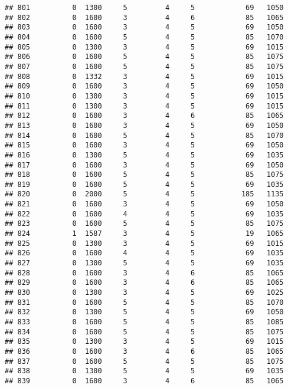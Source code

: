 \documentclass[]{article}
\begin{document}
\begin{verbatim}
## 801          0  1300     5         4     5            69   1050
## 802          0  1600     3         4     6            85   1065
## 803          0  1600     3         4     5            69   1050
## 804          0  1600     5         4     5            85   1070
## 805          0  1300     3         4     5            69   1015
## 806          0  1600     5         4     5            85   1075
## 807          0  1600     5         4     5            85   1075
## 808          0  1332     3         4     5            69   1015
## 809          0  1600     3         4     5            69   1050
## 810          0  1300     3         4     5            69   1015
## 811          0  1300     3         4     5            69   1015
## 812          0  1600     3         4     6            85   1065
## 813          0  1600     3         4     5            69   1050
## 814          0  1600     5         4     5            85   1070
## 815          0  1600     3         4     5            69   1050
## 816          0  1300     5         4     5            69   1035
## 817          0  1600     3         4     5            69   1050
## 818          0  1600     5         4     5            85   1075
## 819          0  1600     5         4     5            69   1035
## 820          0  2000     5         4     5           185   1135
## 821          0  1600     3         4     5            69   1050
## 822          0  1600     4         4     5            69   1035
## 823          0  1600     5         4     5            85   1075
## 824          1  1587     3         4     5            19   1065
## 825          0  1300     3         4     5            69   1015
## 826          0  1600     4         4     5            69   1035
## 827          0  1300     5         4     5            69   1035
## 828          0  1600     3         4     6            85   1065
## 829          0  1600     3         4     6            85   1065
## 830          0  1300     3         4     5            69   1025
## 831          0  1600     5         4     5            85   1070
## 832          0  1300     5         4     5            69   1050
## 833          0  1600     5         4     5            85   1085
## 834          0  1600     5         4     5            85   1075
## 835          0  1300     3         4     5            69   1015
## 836          0  1600     3         4     6            85   1065
## 837          0  1600     5         4     5            85   1075
## 838          0  1300     5         4     5            69   1035
## 839          0  1600     3         4     6            85   1065

\end{verbatim}
\end{document}
